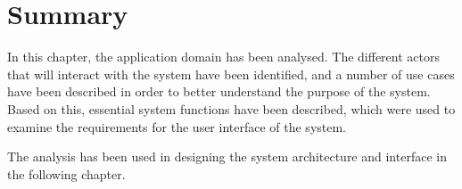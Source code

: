 \section{Summary} \label{ssc:ad_summary}
In this chapter, the application domain has been analysed. The different actors that will interact with the system have been identified, and a number of use cases have been described in order to better understand the purpose of the system. Based on this, essential system functions have been described, which were used to examine the requirements for the user interface of the system. 
\par
The analysis has been used in designing the system architecture and interface in the following chapter.